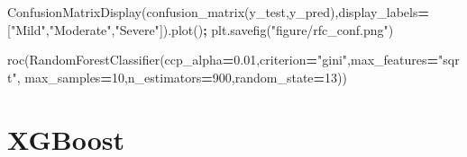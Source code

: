 \documentclass[12pt,twoside]{deuthesis}
\newenvironment{Shaded}{\begin{snugshade}}{\end{snugshade}}
\newcommand{\DecValTok}[1]{\textcolor[rgb]{0.00,0.00,0.81}{#1}}
\newcommand{\FloatTok}[1]{\textcolor[rgb]{0.00,0.00,0.81}{#1}}
\newcommand{\NormalTok}[1]{#1}
\newcommand{\OperatorTok}[1]{\textcolor[rgb]{0.81,0.36,0.00}{\textbf{#1}}}
\newcommand{\StringTok}[1]{\textcolor[rgb]{0.31,0.60,0.02}{#1}}
\begin{document}
\begin{Shaded}
\begin{Highlighting}[]
\NormalTok{ConfusionMatrixDisplay(confusion\_matrix(y\_test,y\_pred),display\_labels}\OperatorTok{=}\NormalTok{[}\StringTok{"Mild"}\NormalTok{,}\StringTok{"Moderate"}\NormalTok{,}\StringTok{"Severe"}\NormalTok{]).plot()}\OperatorTok{;}
\NormalTok{plt.savefig(}\StringTok{"figure/rfc\_conf.png"}\NormalTok{)}
\end{Highlighting}
\end{Shaded}
\begin{Shaded}
\begin{Highlighting}[]
\NormalTok{roc(RandomForestClassifier(ccp\_alpha}\OperatorTok{=}\FloatTok{0.01}\NormalTok{,criterion}\OperatorTok{=}\StringTok{"gini"}\NormalTok{,max\_features}\OperatorTok{=}\StringTok{"sqrt"}\NormalTok{,}
\NormalTok{                                   max\_samples}\OperatorTok{=}\DecValTok{10}\NormalTok{,n\_estimators}\OperatorTok{=}\DecValTok{900}\NormalTok{,random\_state}\OperatorTok{=}\DecValTok{13}\NormalTok{))}
\end{Highlighting}
\end{Shaded}
\hypertarget{xgboost-1}{%
\section{XGBoost}\label{xgboost-1}}
\end{document}
